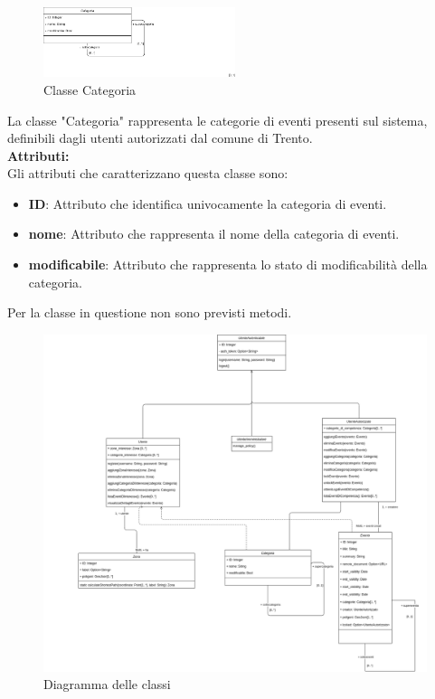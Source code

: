 \documentclass{article}
\begin{document}
\begin{figure}[htbp]
	\centering
	\includegraphics[width=0.5\textwidth]{Images/Categoria-Class.png}
	\caption{Classe Categoria}
	\label{fig:categoria}
\end{figure}

La classe "Categoria" rappresenta le categorie di eventi presenti sul sistema, definibili dagli utenti autorizzati dal comune di Trento.\\

\textbf{Attributi:}\\
Gli attributi che caratterizzano questa classe sono:
\begin{itemize}
	\item \textbf{ID}: Attributo che identifica univocamente la categoria di eventi.
	\item \textbf{nome}: Attributo che rappresenta il nome della categoria di eventi.
	\item \textbf{modificabile}: Attributo che rappresenta lo stato di modificabilità della categoria.\\
\end{itemize}
Per la classe in questione non sono previsti metodi.

\clearpage

\begin{figure}[htbp]
	\centering
	\includegraphics[width=1\textwidth]{Images/ClassDiagram.png}
	\caption{Diagramma delle classi}
	\label{fig:class-diagram}
\end{figure}
\end{document}

